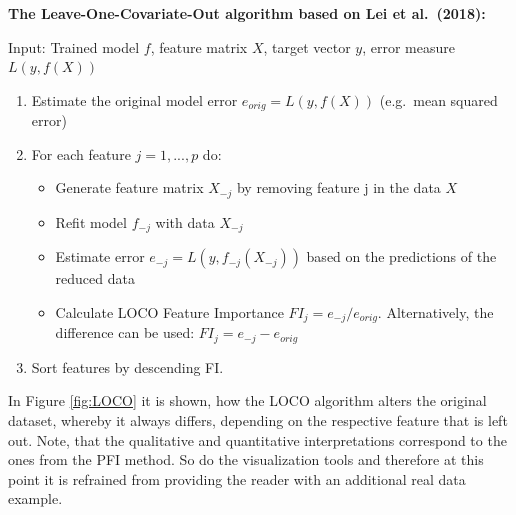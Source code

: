 \documentclass[
]{krantz}
\providecommand{\tightlist}{%
  \setlength{\itemsep}{0pt}\setlength{\parskip}{0pt}}
\begin{document}
\textbf{The Leave-One-Covariate-Out algorithm based on Lei et al.~(2018):}

Input: Trained model \(f\), feature matrix \(X\), target vector \(y\), error measure \(L(y,f(X))\)

\begin{enumerate}
\def\labelenumi{\arabic{enumi}.}
\tightlist
\item
  Estimate the original model error \(e_{orig} = L(y,f(X))\) (e.g.~mean squared error)
\item
  For each feature \(j = 1,...,p\) do:

  \begin{itemize}
  \tightlist
  \item
    Generate feature matrix \(X_{-j}\) by removing feature j in the data \(X\)
  \item
    Refit model \(f_{-j}\) with data \(X_{-j}\)
  \item
    Estimate error \(e_{-j} = L(y,f_{-j}(X_{-j}))\) based on the predictions of the reduced data
  \item
    Calculate LOCO Feature Importance \(FI_{j} = e_{-j}/e_{orig}\). Alternatively, the difference can be used: \(FI_{j} = e_{-j} - e_{orig}\)
  \end{itemize}
\item
  Sort features by descending FI.
\end{enumerate}

In Figure \ref{fig:LOCO} it is shown, how the LOCO algorithm alters the original dataset, whereby it always differs, depending on the respective feature that is left out. Note, that the qualitative and quantitative interpretations correspond to the ones from the PFI method. So do the visualization tools and therefore at this point it is refrained from providing the reader with an additional real data example.
\end{document}
